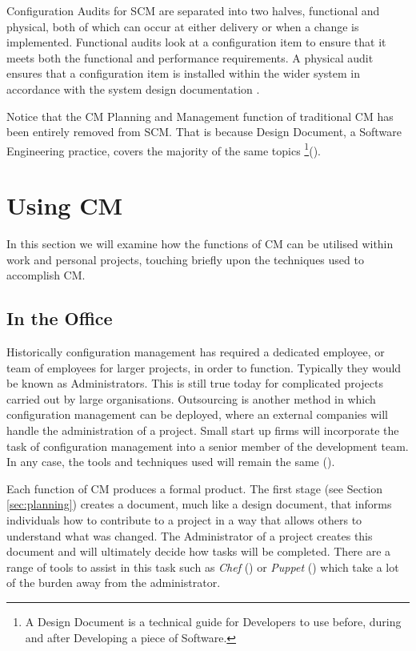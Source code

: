 \documentclass[cmpstyle]{ueacmpstyle}
\begin{document}
		Configuration Audits for SCM are separated into two halves, functional and physical, both of which can occur at either delivery or when a change is implemented. Functional audits look at a configuration item to ensure that it meets both the functional and performance requirements. A physical audit ensures that a configuration item is installed within the wider system in accordance with the system design documentation .
		
		Notice that the CM Planning and Management function of traditional CM has been entirely removed from SCM. That is because Design Document, a Software Engineering practice, covers the majority of the same topics \footnote{A Design Document is a technical guide for Developers to use before, during and after Developing a piece of Software.}(\cite{DesignDocExample}).
		
	\section{Using CM} \label{sec:using}
	In this section we will examine how the functions of CM can be utilised within work and personal projects, touching briefly upon the techniques used to accomplish CM. 
	
		\subsection{In the Office} \label{sec:office}
		Historically configuration management has required a dedicated employee, or team of employees for larger projects, in order to function. Typically they would be known as Administrators. This is still true today for complicated projects carried out by large organisations. Outsourcing is another method in which configuration management can be deployed, where an external companies will handle the administration of a project. Small start up firms will incorporate the task of configuration management into a senior member of the development team. In any case, the tools and techniques used will remain the same (\cite{CM-BestPractices}). 
		
		Each function of CM produces a formal product. The first stage (see Section \ref{sec:planning}) creates a document, much like a design document, that informs individuals how to contribute to a project in a way that allows others to understand what was changed. The Administrator of a project creates this document and will ultimately decide how tasks will be completed. There are a range of tools to assist in this task such as \emph{Chef} (\cite{chef}) or \emph{Puppet} (\cite{puppet}) which take a lot of the burden away from the administrator. 
		
\end{document}
